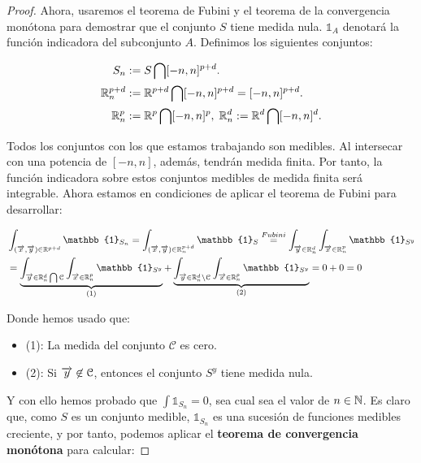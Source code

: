\begin{proof}
    Ahora, usaremos el teorema de Fubini y el teorema de la convergencia monótona para demostrar que el conjunto $S$ tiene medida nula. $\mathbb{1}_A$ denotará la función indicadora del subconjunto $A$. Definimos los siguientes conjuntos:

    \begin{equation}
        \begin{split}
            S_n &:= S \bigcap [-n, n]^{p+d}. \\
            \mathbb{R}_n^{p+d} &:= \mathbb{R}^{p+d} \bigcap [-n, n]^{p+d} = [-n, n]^{p+d}. \\
            \mathbb{R}_n^p &:= \mathbb{R}^p \bigcap [-n, n] ^ p, \; \mathbb{R}_n^d := \mathbb{R}^d \bigcap [-n, n] ^ d. \\
        \end{split}
    \end{equation}

    Todos los conjuntos con los que estamos trabajando son medibles. Al intersecar con una potencia de $[-n, n]$, además, tendrán medida finita. Por tanto, la función indicadora sobre estos conjuntos medibles de medida finita será integrable. Ahora estamos en condiciones de aplicar el teorema de Fubini para desarrollar:

    \begin{equation}
        \begin{split}
            &\int_{(\nv{x}, \nv{y}) \in \R^{p+d}} \mathbb{1}_{S_n} = \int_{(\nv{x},\nv{y}) \in \R_n^{p+d}} \mathbb{1}_{S} \encima{=}{Fubini} \int_{\nv{y} \in \R_n^d} \int_{\nv{x} \in \R_n^p} \mathbb{1}_{S^y} \\
            &= \comentardebajo{\int_{\nv{y} \in \R_n^d \interseccion \mathcal{C}} \int_{\nv{x} \in \R^p_n} \mathbb{1}_{S^y}}{(1)} + \comentardebajo{\int_{\nv{y} \in \R_n^d \setminus \mathcal{C}} \int_{\nv{x} \in \R^p_n} \mathbb{1}_{S^y}}{(2)} = 0 + 0 = 0
        \end{split}
    \end{equation}

    Donde hemos usado que:

    \begin{itemize}
        \item (1): La medida del conjunto $\mathcal{C}$ es cero.
        \item (2): Si $\overrightarrow{y} \not\in \mathcal{C}$, entonces el conjunto $S^{y}$ tiene medida nula.
    \end{itemize}

    Y con ello hemos probado que $\int \mathbb{1}_{S_n} = 0$, sea cual sea el valor de $n \in \mathbb{N}$. Es claro que, como $S$ es un conjunto medible, $\mathbb{1}_{S_n}$ es una sucesión de funciones medibles creciente, y por tanto, podemos aplicar el \textbf{teorema de convergencia monótona} para calcular:


\end{proof}

